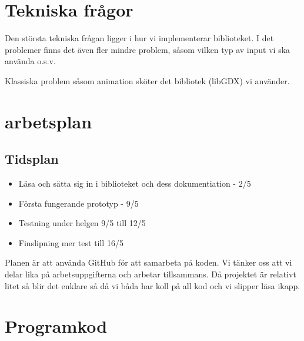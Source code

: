 \documentclass[a4paper,11pt]{article}
\begin{document}
\section{Tekniska frågor}
Den största tekniska frågan ligger i hur vi implementerar biblioteket. I det problemer finns det även fler mindre problem, såsom vilken typ av input vi ska använda o.s.v. 

Klassiska problem såsom animation sköter det bibliotek (libGDX) vi använder.

\section{arbetsplan}
\subsection{Tidsplan}
\begin{itemize}
\item Läsa och sätta sig in i biblioteket och dess dokumentiation - 2/5
\item Första fungerande prototyp - 9/5
\item Testning under helgen 9/5 till 12/5
\item Finslipning mer test till 16/5
\end{itemize}

Planen är att använda GitHub för att samarbeta på koden. Vi tänker oss att vi delar lika på arbetsuppgifterna och arbetar tillsammans. Då projektet är relativt litet så blir det enklare så då vi båda har koll på all kod och vi slipper läsa ikapp.
\pagebreak

\section{Programkod}

\end{document}
